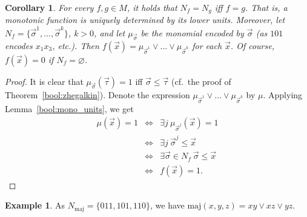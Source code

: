\documentclass[12pt,notitlepage]{article}
\theoremstyle{plain}
\newtheorem{corr}[thm]{Corollary}
\theoremstyle{definition}
\newtheorem{exm}[thm]{Example}
\theoremstyle{plain}
\newcommand{\void}{\varnothing}
\newcommand{\1}{\mathbf{1}}
\newcommand{\0}{\mathbf{0}}
\begin{document}
\begin{corr}\label{bool:monot_monom}
For every $f, g \in M$, it holds that $N_f = N_g$ iff $f = g$. That is, a monotonic function is uniquely determined by its lower units. Moreover, let $N_f = \{ \vec \sigma^1, \ldots,  \vec \sigma^k \}$, $k > 0$, and let $\mu_{\vec \sigma}$ be the monomial encoded by $\vec \sigma$ (as $101$ encodes $x_1 x_3$, etc.). Then $f(\vec x) = \mu_{\vec \sigma^1} \vee \ldots \vee \mu_{\vec \sigma^k}$ for each $\vec x$. Of course, $f(\vec x) = 0$ if $N_f = \void$.
\end{corr}
\begin{proof}
It is clear that $\mu_{\vec \sigma}(\vec \tau) = 1$ iff $\vec \sigma \leq \vec \tau$ (cf.~the proof of Theorem~\ref{bool:zhegalkin}). Denote the expression  $\mu_{\vec \sigma^1} \vee \ldots \vee \mu_{\vec \sigma^k}$ by $\mu$. Applying Lemma~\ref{bool:mono_units}, we get
$$
\begin{array}{rcl}
\mu(\vec x) = 1 &\iff& \exists j\: \mu_{\vec\sigma^j}(\vec x) = 1\\
&\iff& \exists j\: \vec\sigma^j \leq \vec x\\
&\iff& \exists \vec \sigma \in N_f\ \vec\sigma \leq \vec x\\
&\iff& f(\vec x) = 1.
\end{array}
$$
\end{proof}

\begin{exm}
As $N_{\mathrm{maj}} = \{011, 101, 110\}$, we have $\mathrm{maj}(x,y,z) = xy \vee xz \vee yz$.
\end{exm}
\end{document}
